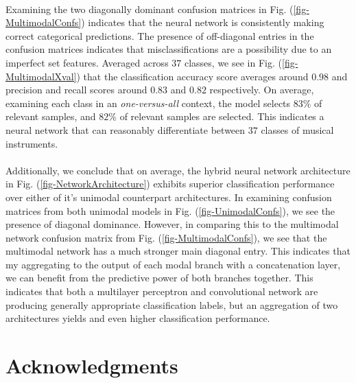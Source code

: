\documentclass[12pt,letterpaper]{article}
\begin{document}
\paragraph*{}Examining the two diagonally dominant confusion matrices in Fig. (\ref{fig-MultimodalConfs}) indicates that the neural network is consistently making correct categorical predictions. The presence of off-diagonal entries in the confusion matrices indicates that misclassifications are a possibility due to an imperfect set features. Averaged across $37$ classes, we see in Fig. (\ref{fig-MultimodalXval}) that the classification accuracy score averages around $0.98$ and precision and recall scores around $0.83$ and $0.82$ respectively. On average, examining each class in an \textit{one-versus-all} context, the model selects $83\%$ of relevant samples, and $82\%$ of relevant samples are selected. This indicates a neural network that can reasonably differentiate between $37$ classes of musical instruments.

\paragraph*{}Additionally, we conclude that on average, the hybrid neural network architecture in Fig. (\ref{fig-NetworkArchitecture}) exhibits superior classification performance over either of it's unimodal counterpart architectures. In examining confusion matrices from both unimodal models in Fig. (\ref{fig-UnimodalConfs}), we see the presence of diagonal dominance. However, in comparing this to the multimodal network confusion matrix from Fig. (\ref{fig-MultimodalConfs}), we see that the multimodal network has a much stronger main diagonal entry. This indicates that my aggregating to the output of each modal branch with a concatenation layer, we can benefit from the predictive power of both branches together. This indicates that both a multilayer perceptron and convolutional network are producing generally appropriate classification labels, but an aggregation of two architectures yields and even higher classification performance. 



\newpage
\section{Acknowledgments}
\label{sec-Acknowledge}
\end{document}
